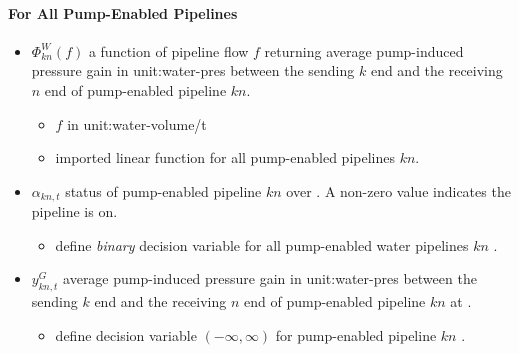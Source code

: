 \paragraph{For All Pump-Enabled Pipelines}
\begin{itemize}

\item $\Phi^{W}_{kn}(f)$ a function of pipeline flow $f$ returning average
  pump-induced pressure gain in \gls{unit:water-pres} between the sending $k$
  end and the receiving $n$ end of pump-enabled pipeline $kn$.

  \begin{itemize}
  \item $f$ in \gls{unit:water-volume/t}
  \item \gls{imported} linear function for all pump-enabled pipelines $kn$.
  \end{itemize}

\item $\alpha_{kn,t}$ status of pump-enabled pipeline $kn$ over \intervaloft{}.
  A non-zero value indicates the pipeline is on.
  \begin{itemize}
  \item \gls{define} \emph{binary} decision variable for all pump-enabled water
    pipelines $kn$ \atallt{}.
  \end{itemize}

\item $y^G_{kn,t}$ average pump-induced pressure gain in \gls{unit:water-pres}
  between the sending $k$ end and the receiving $n$ end of pump-enabled pipeline
  $kn$ at \intervaloft{}.
  \begin{itemize}
  \item \gls{define} decision variable $(-\infty, \infty)$ for pump-enabled
    pipeline $kn$ \atallt{}.
  \end{itemize}

\end{itemize}
